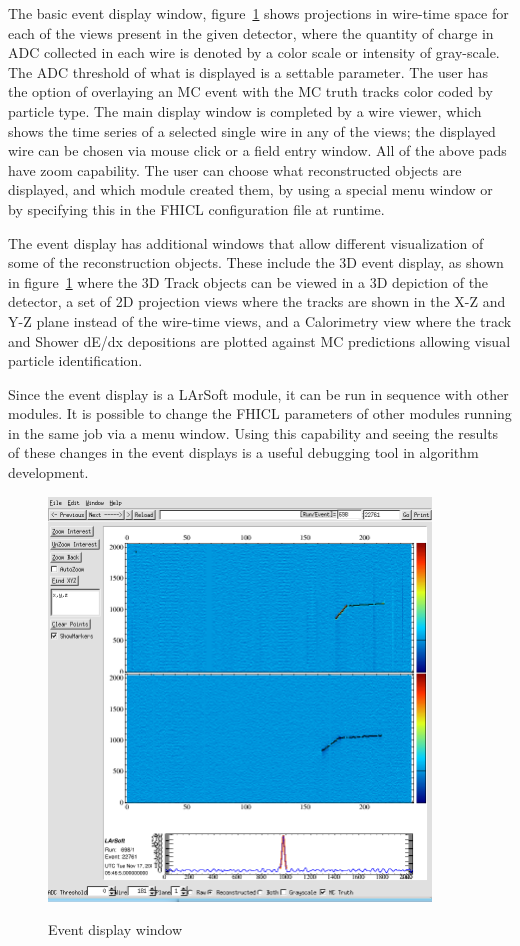 \documentclass[12pt]{elsarticle}
\newcommand{\larsoft}{LArSoft }
\begin{document}
The basic event display window, figure~\ref{2d_event} shows projections in wire-time space for each of the views present in the given detector, where the quantity of charge in ADC collected in each wire is denoted by a color scale or intensity of gray-scale. The ADC threshold of what is displayed is a settable parameter. 
The user has the option of overlaying an MC event with the MC truth tracks color coded by particle type. The main display window is completed by a wire viewer, which shows the time series of a selected single wire in any of the views; the displayed wire can be chosen via mouse click or a field entry window.
All of the above pads have zoom capability. The user can choose what reconstructed objects are displayed, and which module created them, by using a special menu window or by specifying this in the FHICL configuration file at runtime. 

The event display has additional windows that allow different visualization of some of the reconstruction objects. These include the 3D event display, as shown in figure~\ref{2d_event} where the 3D Track objects can be viewed in a 3D depiction of the detector, a set of 2D projection views where the tracks are shown in the X-Z and Y-Z plane instead of the wire-time views, and a Calorimetry view where the track and Shower dE/dx depositions are plotted against MC predictions allowing visual particle identification. 

Since the event display is a \larsoft module, it can be run in sequence with other modules. It is possible to change the FHICL parameters of other modules running in the same job via a menu window. Using this capability and seeing the results of these changes in the event displays is a useful debugging tool in algorithm development.


\hspace*{2cm}
\begin{figure}[h]
\centering
\caption{Event display window}
\includegraphics[width=4.0in]{./imgs/larsoft_2d_event_display.png}
\label{2d_event}
\end{figure}
\end{document}
